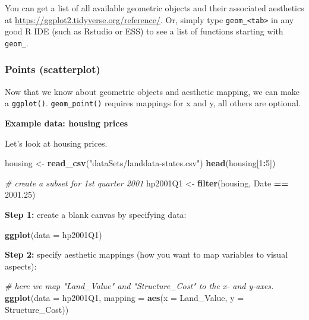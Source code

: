 \documentclass[
]{book}
\newenvironment{Shaded}{\begin{snugshade}}{\end{snugshade}}
\newcommand{\CommentTok}[1]{\textcolor[rgb]{0.56,0.35,0.01}{\textit{#1}}}
\newcommand{\DataTypeTok}[1]{\textcolor[rgb]{0.13,0.29,0.53}{#1}}
\newcommand{\DecValTok}[1]{\textcolor[rgb]{0.00,0.00,0.81}{#1}}
\newcommand{\FloatTok}[1]{\textcolor[rgb]{0.00,0.00,0.81}{#1}}
\newcommand{\KeywordTok}[1]{\textcolor[rgb]{0.13,0.29,0.53}{\textbf{#1}}}
\newcommand{\NormalTok}[1]{#1}
\newcommand{\OperatorTok}[1]{\textcolor[rgb]{0.81,0.36,0.00}{\textbf{#1}}}
\newcommand{\StringTok}[1]{\textcolor[rgb]{0.31,0.60,0.02}{#1}}
\begin{document}
You can get a list of all available geometric objects and their associated aesthetics at \url{https://ggplot2.tidyverse.org/reference/}. Or, simply type \texttt{geom\_\textless{}tab\textgreater{}} in any good R IDE (such as Rstudio or ESS) to see a list of functions starting with \texttt{geom\_}.

\hypertarget{points-scatterplot}{%
\subsubsection{Points (scatterplot)}\label{points-scatterplot}}

Now that we know about geometric objects and aesthetic mapping, we can make a \texttt{ggplot()}. \texttt{geom\_point()} requires mappings for x and y, all others are optional.

\textbf{Example data: housing prices}

Let's look at housing prices.

\begin{Shaded}
\begin{Highlighting}[]
\NormalTok{housing <-}\StringTok{ }\KeywordTok{read_csv}\NormalTok{(}\StringTok{"dataSets/landdata-states.csv"}\NormalTok{)}
\KeywordTok{head}\NormalTok{(housing[}\DecValTok{1}\OperatorTok{:}\DecValTok{5}\NormalTok{])}

\CommentTok{# create a subset for 1st quarter 2001}
\NormalTok{hp2001Q1 <-}\StringTok{ }\KeywordTok{filter}\NormalTok{(housing, Date }\OperatorTok{==}\StringTok{ }\FloatTok{2001.25}\NormalTok{)}
\end{Highlighting}
\end{Shaded}

\textbf{Step 1:} create a blank canvas by specifying data:

\begin{Shaded}
\begin{Highlighting}[]
\KeywordTok{ggplot}\NormalTok{(}\DataTypeTok{data =}\NormalTok{ hp2001Q1)}
\end{Highlighting}
\end{Shaded}

\textbf{Step 2:} specify aesthetic mappings (how you want to map variables to visual aspects):

\begin{Shaded}
\begin{Highlighting}[]
\CommentTok{# here we map "Land_Value" and "Structure_Cost" to the x- and y-axes.}
\KeywordTok{ggplot}\NormalTok{(}\DataTypeTok{data =}\NormalTok{ hp2001Q1, }\DataTypeTok{mapping =} \KeywordTok{aes}\NormalTok{(}\DataTypeTok{x =}\NormalTok{ Land_Value, }\DataTypeTok{y =}\NormalTok{ Structure_Cost))}
\end{Highlighting}
\end{Shaded}
\end{document}
